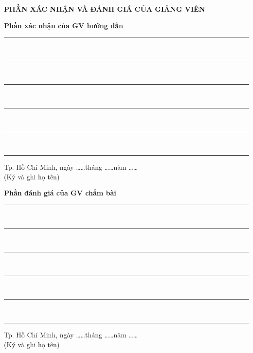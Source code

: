 \newpage
\begin{center}
    \textbf{\fontsize{16pt}{24pt}\selectfont PHẦN XÁC NHẬN VÀ ĐÁNH GIÁ CỦA GIẢNG VIÊN}
\end{center}

\vspace{0.5cm}

\noindent \textbf{Phần xác nhận của GV hướng dẫn} \\
\rule{\textwidth}{0.4pt} \\ 
\rule{\textwidth}{0.4pt} \\
\rule{\textwidth}{0.4pt} \\ 
\rule{\textwidth}{0.4pt} \\ 
\rule{\textwidth}{0.4pt} \\ 
\rule{0.7\textwidth}{0.4pt} %

\vspace{0.3cm}
\begin{flushright}
    \begin{minipage}{0.5\textwidth}
        \centering
        Tp. Hồ Chí Minh, ngày \dots\dots tháng \dots\dots năm \dots\dots \\
        (Ký và ghi họ tên)
        \vspace{2.5cm} %
    \end{minipage}
\end{flushright}


\noindent \textbf{Phần đánh giá của GV chấm bài} \\
\rule{\textwidth}{0.4pt} \\
\rule{\textwidth}{0.4pt} \\ 
\rule{\textwidth}{0.4pt} \\ 
\rule{\textwidth}{0.4pt} \\
\rule{\textwidth}{0.4pt} \\ 
\rule{0.7\textwidth}{0.4pt}

\vspace{0.3cm}
\begin{flushright}
    \begin{minipage}{0.5\textwidth}
        \centering
        Tp. Hồ Chí Minh, ngày \dots\dots tháng \dots\dots năm \dots\dots \\
        (Ký và ghi họ tên)
        \vspace{2.5cm}
    \end{minipage}
\end{flushright}